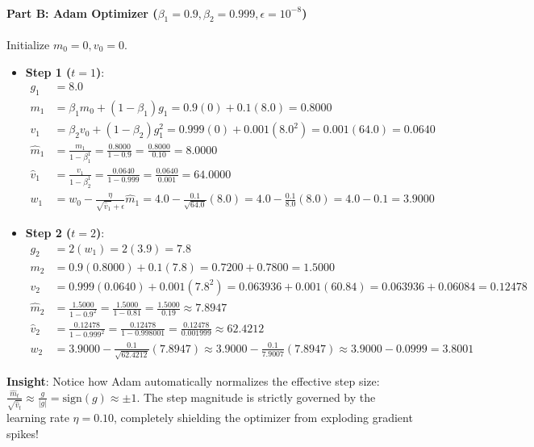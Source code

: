 \begin{example}
\paragraph{Part B: Adam Optimizer ($\beta_1 = 0.9, \beta_2 = 0.999, \epsilon = 10^{-8}$)}
Initialize $m_0 = 0, v_0 = 0$.
\begin{itemize}
    \item \textbf{Step 1 ($t = 1$)}:
    \begin{align*}
    g_1 &= 8.0 \\
    m_1 &= \beta_1 m_0 + (1 - \beta_1)g_1 = 0.9(0) + 0.1(8.0) = \mathbf{0.8000} \\
    v_1 &= \beta_2 v_0 + (1 - \beta_2)g_1^2 = 0.999(0) + 0.001(8.0^2) = 0.001(64.0) = \mathbf{0.0640} \\
    \hat{m}_1 &= \frac{m_1}{1 - \beta_1^1} = \frac{0.8000}{1 - 0.9} = \frac{0.8000}{0.10} = \mathbf{8.0000} \\
    \hat{v}_1 &= \frac{v_1}{1 - \beta_2^1} = \frac{0.0640}{1 - 0.999} = \frac{0.0640}{0.001} = \mathbf{64.0000} \\
    w_1 &= w_0 - \frac{\eta}{\sqrt{\hat{v}_1} + \epsilon} \hat{m}_1 = 4.0 - \frac{0.1}{\sqrt{64.0}} (8.0) = 4.0 - \frac{0.1}{8.0}(8.0) = 4.0 - 0.1 = \mathbf{3.9000}
    \end{align*}
    \item \textbf{Step 2 ($t = 2$)}:
    \begin{align*}
    g_2 &= 2(w_1) = 2(3.9) = 7.8 \\
    m_2 &= 0.9(0.8000) + 0.1(7.8) = 0.7200 + 0.7800 = \mathbf{1.5000} \\
    v_2 &= 0.999(0.0640) + 0.001(7.8^2) = 0.063936 + 0.001(60.84) = 0.063936 + 0.06084 = \mathbf{0.12478} \\
    \hat{m}_2 &= \frac{1.5000}{1 - 0.9^2} = \frac{1.5000}{1 - 0.81} = \frac{1.5000}{0.19} \approx \mathbf{7.8947} \\
    \hat{v}_2 &= \frac{0.12478}{1 - 0.999^2} = \frac{0.12478}{1 - 0.998001} = \frac{0.12478}{0.001999} \approx \mathbf{62.4212} \\
    w_2 &= 3.9000 - \frac{0.1}{\sqrt{62.4212}} (7.8947) \approx 3.9000 - \frac{0.1}{7.9007}(7.8947) \approx 3.9000 - 0.0999 = \mathbf{3.8001}
    \end{align*}
\end{itemize}
\textbf{Insight}: Notice how Adam automatically normalizes the effective step size: $\frac{\hat{m}_t}{\sqrt{\hat{v}_t}} \approx \frac{g}{|g|} = \text{sign}(g) \approx \pm 1$. The step magnitude is strictly governed by the learning rate $\eta = 0.10$, completely shielding the optimizer from exploding gradient spikes!
\end{example}

